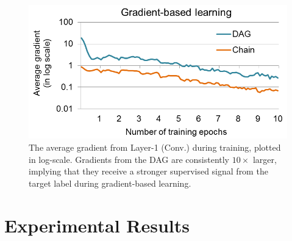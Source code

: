 \documentclass[10pt,twocolumn,letterpaper]{article}
\begin{document}
\begin{figure}[htbp]
\centering
\includegraphics[width=.9\columnwidth]{fig/fig_grad.png}
\caption{The average gradient from Layer-1 (Conv.) during training, plotted in log-scale. Gradients from the DAG are consistently $10\times$ larger, implying that they receive a stronger supervised signal from the target label during gradient-based learning.}
\label{fig:grad}
\end{figure}



\section{Experimental Results\label{sec:exp}}
\end{document}

